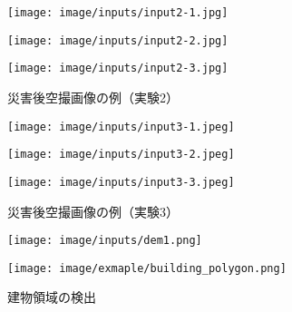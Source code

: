     \begin{figure}[t]
      \begin{minipage}[c]{0.329\hsize}
        \centering
        \texttt{[image: image/inputs/input2-1.jpg]}
      \end{minipage}
      \begin{minipage}[c]{0.329\hsize}
        \centering
        \texttt{[image: image/inputs/input2-2.jpg]}
      \end{minipage}
      \begin{minipage}[c]{0.329\hsize}
        \centering
        \texttt{[image: image/inputs/input2-3.jpg]}
      \end{minipage}
      \caption{災害後空撮画像の例（実験2）}
      \label{空撮画像2}
    \end{figure}

    \begin{figure}[t]
      \begin{minipage}[c]{0.329\hsize}
        \centering
        \texttt{[image: image/inputs/input3-1.jpeg]}
      \end{minipage}
      \begin{minipage}[c]{0.329\hsize}
        \centering
        \texttt{[image: image/inputs/input3-2.jpeg]}
      \end{minipage}
      \begin{minipage}[c]{0.329\hsize}
        \centering
        \texttt{[image: image/inputs/input3-3.jpeg]}
      \end{minipage}
      \caption{災害後空撮画像の例（実験3）}
      \label{空撮画像3}
    \end{figure}

    \begin{figure}[t]
      \begin{minipage}[c]{0.45\hsize}
        \centering
        \texttt{[image: image/inputs/dem1.png]}
      \end{minipage}
      \begin{minipage}[c]{0.45\hsize}
        \centering
        \texttt{[image: image/exmaple/building\_polygon.png]}
      \end{minipage}
      \caption{建物領域の検出}
      \label{基盤地図情報（実験1）}
    \end{figure}

